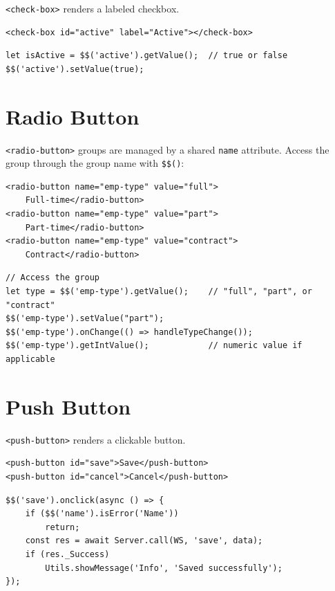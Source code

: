 \texttt{<check-box>} renders a labeled checkbox.

\begin{lstlisting}[style=html]
<check-box id="active" label="Active"></check-box>
\end{lstlisting}

\begin{lstlisting}[style=javascript]
let isActive = $$('active').getValue();  // true or false
$$('active').setValue(true);
\end{lstlisting}

\section{Radio Button}
\label{sec:comp-radio}

\texttt{<radio-button>} groups are managed by a shared \texttt{name} attribute.  Access the group through the group name with \texttt{\$\$()}:

\begin{lstlisting}[style=html]
<radio-button name="emp-type" value="full">
    Full-time</radio-button>
<radio-button name="emp-type" value="part">
    Part-time</radio-button>
<radio-button name="emp-type" value="contract">
    Contract</radio-button>
\end{lstlisting}

\begin{lstlisting}[style=javascript]
// Access the group
let type = $$('emp-type').getValue();    // "full", "part", or "contract"
$$('emp-type').setValue("part");
$$('emp-type').onChange(() => handleTypeChange());
$$('emp-type').getIntValue();            // numeric value if applicable
\end{lstlisting}

\section{Push Button}
\label{sec:comp-button}

\texttt{<push-button>} renders a clickable button.

\begin{lstlisting}[style=html]
<push-button id="save">Save</push-button>
<push-button id="cancel">Cancel</push-button>
\end{lstlisting}

\begin{lstlisting}[style=javascript]
$$('save').onclick(async () => {
    if ($$('name').isError('Name'))
        return;
    const res = await Server.call(WS, 'save', data);
    if (res._Success)
        Utils.showMessage('Info', 'Saved successfully');
});
\end{lstlisting}

